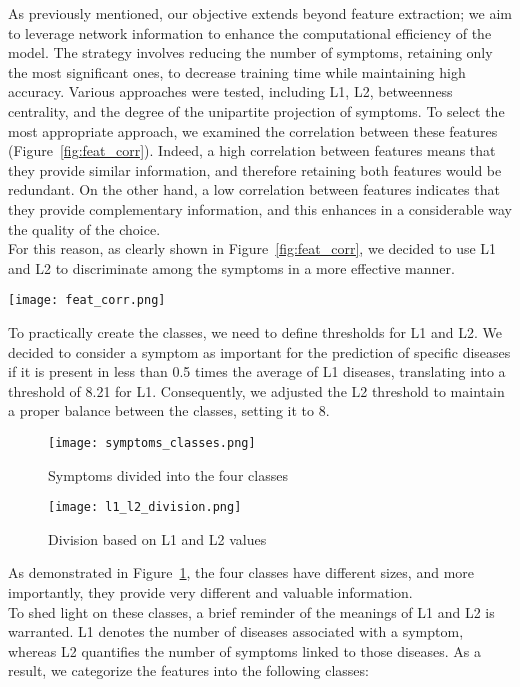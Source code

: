 As previously mentioned, our objective extends beyond feature extraction; we aim to leverage network information to
enhance the computational efficiency of the model. The strategy involves reducing the number of symptoms,
retaining only the most significant ones, to decrease training time while maintaining high accuracy.
Various approaches were tested, including L1, L2, betweenness centrality, and the degree of the unipartite projection
of symptoms. To select the most appropriate approach, we examined the correlation between these features
(Figure~\ref{fig:feat_corr}). Indeed, a high correlation between features means that they provide
similar information, and therefore retaining both features would be redundant. On the other hand,
a low correlation between features indicates that they provide complementary information, and this enhances
in a considerable way the quality of the choice.\\
For this reason, as clearly shown in Figure~\ref{fig:feat_corr}, we decided to use L1 and L2 to discriminate
among the symptoms in a more effective manner.

\begin{figure*}[!t]
    \centering
    \texttt{[image: feat\_corr.png]}
    \caption{Correlation between features}\label{fig:feat_corr}
\end{figure*}

\noindent
To practically create the classes, we need to define thresholds for L1 and L2. We decided to consider
a symptom as important for the prediction of specific diseases if it is present in less than 0.5 times the average of L1 diseases,
translating into a threshold of 8.21 for L1. Consequently, we adjusted the L2 threshold to maintain a proper balance
between the classes, setting it to 8.

\begin{figure}[H]
    \centering
    \texttt{[image: symptoms\_classes.png]}
    \caption{Symptoms divided into the four classes}\label{fig:symptoms_classes}
\end{figure}

\begin{figure}[H]
    \centering
    \texttt{[image: l1\_l2\_division.png]}
    \caption{Division based on L1 and L2 values}\label{fig:l1_l2_division}
\end{figure}

\noindent
As demonstrated in Figure~\ref{fig:symptoms_classes}, the four classes have different sizes, and more importantly,
they provide very different and valuable information.\\
To shed light on these classes, a brief reminder of the meanings of L1 and L2 is warranted. L1 denotes the number
of diseases associated with a symptom, whereas L2 quantifies the number of symptoms linked to those diseases.
As a result, we categorize the features into the following classes:\\

